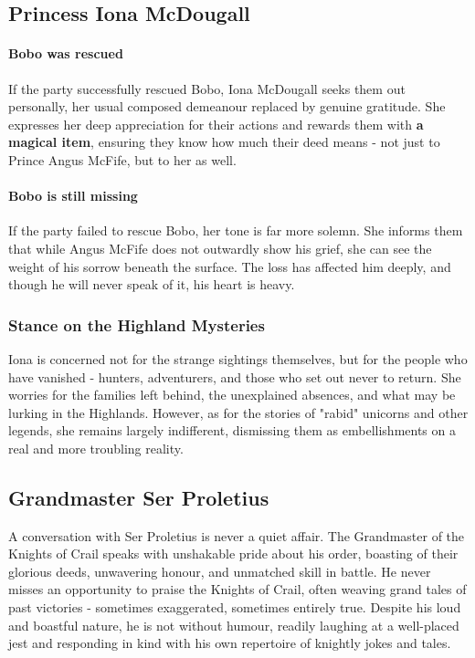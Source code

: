 \subsection*{Princess Iona McDougall}
{\entryfont \paragraph*{Bobo was rescued} If the party successfully rescued Bobo, Iona McDougall seeks them out personally, her usual composed demeanour replaced by genuine gratitude. She expresses her deep appreciation for their actions and rewards them with \textbf{a magical item}, ensuring they know how much their deed means - not just to Prince Angus McFife, but to her as well.}
{\entryfont \paragraph*{Bobo is still missing}
If the party failed to rescue Bobo, her tone is far more solemn. She informs them that while Angus McFife does not outwardly show his grief, she can see the weight of his sorrow beneath the surface. The loss has affected him deeply, and though he will never speak of it, his heart is heavy.}
\subsubsection*{Stance on the Highland Mysteries}
{\entryfont Iona is concerned not for the strange sightings themselves, but for the people who have vanished - hunters, adventurers, and those who set out never to return. She worries for the families left behind, the unexplained absences, and what may be lurking in the Highlands. However, as for the stories of "rabid" unicorns and other legends, she remains largely indifferent, dismissing them as embellishments on a real and more troubling reality.}
\subsection*{Grandmaster Ser Proletius}
{\entryfont A conversation with Ser Proletius is never a quiet affair. The Grandmaster of the Knights of Crail speaks with unshakable pride about his order, boasting of their glorious deeds, unwavering honour, and unmatched skill in battle. He never misses an opportunity to praise the Knights of Crail, often weaving grand tales of past victories - sometimes exaggerated, sometimes entirely true. Despite his loud and boastful nature, he is not without humour, readily laughing at a well-placed jest and responding in kind with his own repertoire of knightly jokes and tales.}
